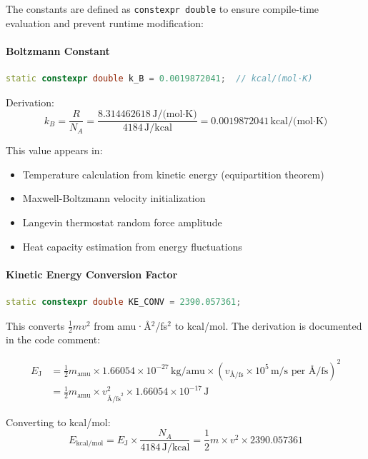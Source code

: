 \documentclass[11pt]{article}
\begin{document}
The constants are defined as \texttt{constexpr double} to ensure compile-time evaluation and prevent runtime modification:

\paragraph{Boltzmann Constant}

\begin{lstlisting}[language=C++]
static constexpr double k_B = 0.0019872041;  // kcal/(mol·K)
\end{lstlisting}

Derivation:
\begin{equation}
k_B = \frac{R}{N_A} = \frac{8.314462618\,\text{J/(mol·K)}}{4184\,\text{J/kcal}} = 0.0019872041\,\text{kcal/(mol·K)}
\end{equation}

This value appears in:
\begin{itemize}
\item Temperature calculation from kinetic energy (equipartition theorem)
\item Maxwell-Boltzmann velocity initialization
\item Langevin thermostat random force amplitude
\item Heat capacity estimation from energy fluctuations
\end{itemize}

\paragraph{Kinetic Energy Conversion Factor}

\begin{lstlisting}[language=C++]
static constexpr double KE_CONV = 2390.057361;
\end{lstlisting}

This converts $\frac{1}{2}m v^2$ from amu·\AA$^2$/fs$^2$ to kcal/mol. The derivation is documented in the code comment:

\begin{align}
E_{\text{J}} &= \frac{1}{2} m_{\text{amu}} \times 1.66054 \times 10^{-27}\,\text{kg/amu} \times (v_{\text{\AA/fs}} \times 10^5\,\text{m/s per \AA/fs})^2 \\
&= \frac{1}{2} m_{\text{amu}} \times v^2_{\text{\AA/fs}^2} \times 1.66054 \times 10^{-17}\,\text{J}
\end{align}

Converting to kcal/mol:
\begin{equation}
E_{\text{kcal/mol}} = E_{\text{J}} \times \frac{N_A}{4184\,\text{J/kcal}} = \frac{1}{2} m \times v^2 \times 2390.057361
\end{equation}
\end{document}

